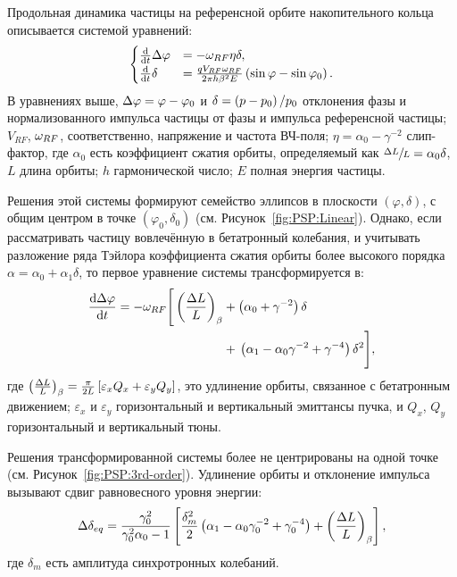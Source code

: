 Продольная динамика частицы на референсной орбите накопительного кольца описывается
системой уравнений:
\begin{equation}
\begin{cases}
\ddt{}\D\varphi &= -\w_{RF}\eta\delta, \\
\ddt{}\delta &= \frac{q V_{RF}\w_{RF}}{2\pi h\beta^2E}\bkt{\sin\varphi - \sin\varphi_0}.
\end{cases}
\end{equation}
В уравнениях выше, $\Delta\varphi = \varphi - \varphi_0$ и
$\delta = \bkt{p-p_0}/{p_0}$ отклонения фазы и нормализованного импульса частицы
от фазы и импульса референсной частицы;
 $V_{RF}$, $\omega_{RF}$, соответственно,
 напряжение и частота ВЧ-поля; $\eta = \alpha_0 - \gamma^{-2}$ слип-фактор,
 где $\alpha_0$ есть коэффициент сжатия орбиты, определяемый как $\sfrac{\Delta L}{L} = \alpha_0\delta$,
 $L$ длина орбиты; $h$ гармонической число; $E$ полная энергия частицы.

Решения этой системы формируют семейство эллипсов в плоскости $(\varphi, \delta)$, с общим центром в
точке $(\varphi_0,\delta_0)$ (см. Рисунок~\ref{fig:PSP:Linear}). Однако, если рассматривать частицу вовлечённую в бетатронный колебания, и
учитывать разложение ряда Тэйлора коэффициента сжатия орбиты более высокого порядка
$\alpha = \alpha_0 + \alpha_1\delta$, то первое уравнение системы
трансформируется в:~\cite[p.~2579]{Senichev:IPAC13}
\begin{align*}
\ddt{\D\varphi} = -\w_{RF} \Bigg[\bkt{\frac{\Delta L}{L}}_\beta &+ \bkt{\alpha_0 + \gamma^{-2}}\delta \Bigg.\\
&+ \Bigg.\bkt{\alpha_1 - \alpha_0\gamma^{-2} + \gamma^{-4}}\delta^2\Bigg],
\end{align*}
где $\bkt{\frac{\Delta L}{L}}_\beta = \frac{\pi}{2L}\bkt*{\varepsilon_xQ_x + \varepsilon_yQ_y}$, это
удлинение орбиты, связанное с бетатронным движением; $\varepsilon_x$ и $\varepsilon_y$ 
горизонтальный и вертикальный эмиттансы пучка, и $Q_x$, $Q_y$ горизонтальный и вертикальный тюны.

Решения трансформированной системы более не центрированы на одной точке (см. Рисунок~\ref{fig:PSP:3rd-order}). Удлинение орбиты
и отклонение импульса вызывают сдвиг равновесного уровня энергии:~\cite[p.~2581]{Senichev:IPAC13}
\begin{equation}\label{eq:EquLevMom_shift}
\Delta\delta_{eq} = \frac{\gamma_0^2}{\gamma_0^2\alpha_0 - 1}\bkt*{\frac{\delta_m^2}{2}\bkt{\alpha_1 - \alpha_0\gamma_0^{-2} + \gamma_0^{-4}} + \bkt{\frac{\Delta L}{L}}_\beta},
\end{equation}
где $\delta_m$ есть амплитуда синхротронных колебаний.

